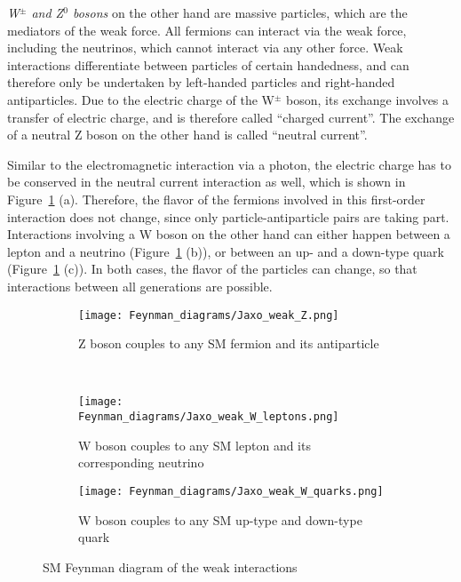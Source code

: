\noindent\begin{minipage}{0.55\textwidth}
\textit{W$^\pm$ and Z$^0$ bosons} on the other hand are massive particles, which are the mediators of the weak force.
All fermions can interact via the weak force, including the neutrinos, which cannot interact via any other force.
Weak interactions differentiate between particles of certain handedness, and can therefore only be undertaken by left-handed particles and right-handed antiparticles.
Due to the electric charge of the W$^\pm$ boson, its exchange involves a transfer of electric charge, and is therefore called ``charged current''.
The exchange of a neutral Z boson on the other hand is called ``neutral current''.

Similar to the electromagnetic interaction via a photon, the electric charge has to be conserved in the neutral current interaction as well, which is shown in Figure~\ref{fig:Feynman:weak} (a).
Therefore, the flavor of the fermions involved in this first-order interaction does not change, since only particle-antiparticle pairs are taking part.
\\Interactions involving a W boson on the other hand can either happen between a lepton and a neutrino (Figure~\ref{fig:Feynman:weak} (b)), or between an up- and a down-type quark (Figure~\ref{fig:Feynman:weak} (c)). 
In both cases, the flavor of the particles can change, so that interactions between all generations are possible.
\end{minipage} \hfill
\begin{minipage}{0.4\textwidth}
\centering
\begin{figure}[H]
\centering
\begin{subfigure}[b]{\textwidth}\centering
\texttt{[image: Feynman\_diagrams/Jaxo\_weak\_Z.png]}
\caption{Z boson couples to any SM fermion and its antiparticle}
\end{subfigure}\\
\begin{subfigure}[t]{0.48\textwidth}\centering
\texttt{[image: Feynman\_diagrams/Jaxo\_weak\_W\_leptons.png]}
\caption{W boson couples to any SM lepton and its corresponding neutrino}
\end{subfigure}\hfill
\begin{subfigure}[t]{0.48\textwidth}\centering
\texttt{[image: Feynman\_diagrams/Jaxo\_weak\_W\_quarks.png]}
\caption{W boson couples to any SM up-type and down-type quark}
\end{subfigure}
\caption{SM Feynman diagram of the weak interactions}
\label{fig:Feynman:weak} 
\end{figure}
\end{minipage}
